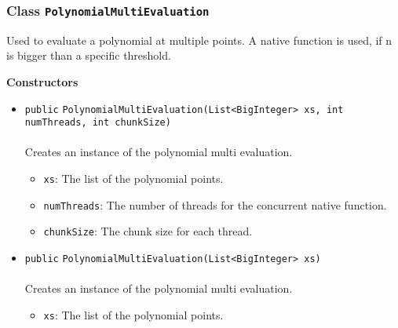 \subsubsection{Class \lstinline|PolynomialMultiEvaluation|}
Used to evaluate a polynomial at multiple points. A native function is used, if n
 is bigger than a specific threshold. \\
\noindent\begin{minipage}[t]{5cm}
\vspace{0.3em}
\hspace*{2em}
\vspace{0.3em}
\end{minipage}




\textbf{\sffamily Constructors}
\begin{itemize}
\item \lstinline|public| \lstinline|PolynomialMultiEvaluation|\lstinline|(List<BigInteger> xs, int numThreads, int chunkSize)|\\ \\[-0.6em]
Creates an instance of the polynomial multi evaluation.
\begin{itemize}
\item \lstinline|xs|: The list of the polynomial points.
\item \lstinline|numThreads|: The number of threads for the concurrent native function.
\item \lstinline|chunkSize|: The chunk size for each thread.
\end{itemize}



\item \lstinline|public| \lstinline|PolynomialMultiEvaluation|\lstinline|(List<BigInteger> xs)|\\ \\[-0.6em]
Creates an instance of the polynomial multi evaluation.
\begin{itemize}
\item \lstinline|xs|: The list of the polynomial points.
\end{itemize}



\end{itemize}


